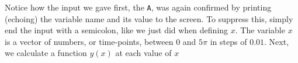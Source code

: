 Notice how the input we gave first, the \lstinline{A}, was again confirmed by printing (echoing) the variable name and its value to the screen.
To suppress this, simply end the input with a semicolon, like we just did when defining $x$.
The variable $x$ is a vector of numbers, or time-points, between $0$ and $5 \pi$ in steps of $0.01$.
Next, we calculate a function $y(x)$ at each value of $x$